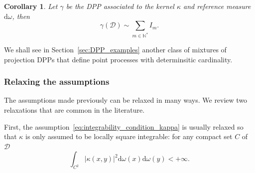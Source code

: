 \documentclass[twoside,11pt]{book}
\newtheorem{corollary}{Corollary}
\newtheorem{example}{Example}
\numberwithin{theorem}{chapter}
\numberwithin{definition}{chapter}
\numberwithin{proposition}{chapter}
\numberwithin{corollary}{chapter}
\numberwithin{example}{chapter}
\numberwithin{lemma}{chapter}
\numberwithin{assumption}{chapter}
\numberwithin{equation}{chapter}
\numberwithin{figure}{chapter}
\begin{document}
\begin{corollary}

Let $\gamma$ be the DPP associated to the kernel $\kappa$ and reference measure $\mathrm{d}\omega$,
then 
\begin{equation}
\gamma(\mathcal{D}) \sim \sum\limits_{m \in \mathbb{N}^{*}} I_{m}.
\end{equation}
\end{corollary}
We shall see in Section~\ref{sec:DPP_examples} another class of mixtures of projection DPPs that define point processes with determinsitic cardinality.






\subsubsection{Relaxing the assumptions}



The assumptions made previously can be relaxed in many ways. We review two relaxations that are common in the literature.

First, the assumption~\eqref{eq:integrability_condition_kappa} is usually relaxed so that $\kappa$ is only assumed to be locally square integrable: for any compact set $C$ of $\mathcal{D}$
\begin{equation}
\int_{C^{2}} |\kappa(x,y)|^{2} \mathrm{d}\omega(x) \mathrm{d}\omega(y) < +\infty.
\end{equation}
\end{document}
